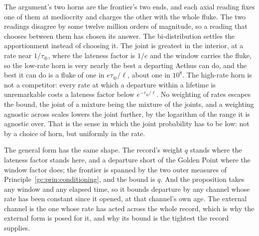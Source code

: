 \begin{remark}\label{gc:rem:departurehorns}
The argument's two horns are the frontier's two ends, and each axial
reading fixes one of them at mediocrity and charges the other with the
whole fluke. The two readings disagree by some twelve million orders of
magnitude, so a reading that chooses between them has chosen its answer.
The bi-distribution settles the apportionment instead of choosing it.
The joint is greatest in the interior, at a rate near $1/\tau_\oplus$,
where the lateness factor is $1/e$ and the window carries the fluke, so
the low-rate horn is very nearly the best a departing Aethus can do, and
the best it can do is a fluke of one in $e\tau_\oplus/\ell$, about one in
$10^{8}$. The high-rate horn is not a competitor: every rate at which a
departure within a lifetime is unremarkable costs a lateness factor below
$e^{-\tau_\oplus/\ell}$. No weighting of rates escapes the bound, the
joint of a mixture being the mixture of the joints, and a weighting
agnostic across scales lowers the joint further, by the logarithm of the
range it is agnostic over. That is the sense in which the joint
probability has to be low: not by a choice of horn, but uniformly in the
rate.

The general form has the same shape. The record's weight $q$ stands where
the lateness factor stands here, and a departure short of the Golden
Point where the window factor does; the frontier is spanned by the two
outer measures of Principle~\ref{gc:prin:conditioning}, and the bound is
$q$. And the proposition takes any window and any elapsed time, so it
bounds departure by any channel whose rate has been constant since it
opened, at that channel's own age. The external channel is the one whose
rate has acted across the whole record, which is why the external form
is posed for it, and why its bound is the tightest the record supplies.
\end{remark}

